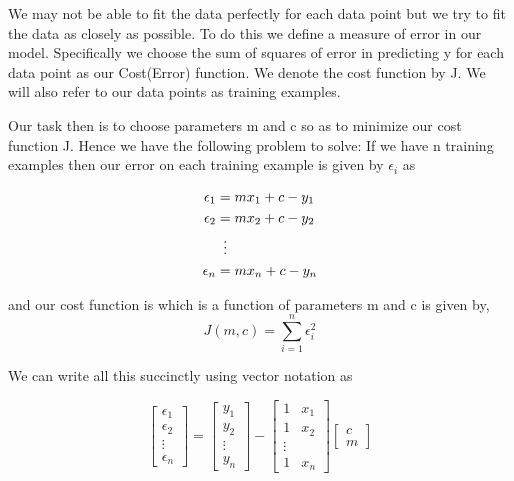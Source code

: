 \documentclass[14pt]{article}
\begin{document}
    We may not be able to fit the data perfectly for each data point but we try to fit the data as closely as possible.
    To do this we define a measure of error in our model.
    Specifically we choose the sum of squares of error in predicting y for each data point as our Cost(Error) function. We denote the cost function by J. We will also refer to our data points as training examples.

    Our task then is to choose parameters m and c so as to minimize our cost function J. Hence we have the following problem to solve: If we have n training examples then our error on each training example is given by $ \epsilon_{i} $ as

    \begin{align}
        \epsilon_{1} &= mx_{1} + c - y_{1} \\
        \epsilon_{2} &= mx_{2} + c - y_{2} \\
        &\vdotswithin{=} \nonumber \\
        \epsilon_{n} &= mx_{n} + c - y_{n} \\
    \end{align}

    \noindent and our cost function is which is a function of parameters m and c is given by,
    \[ J(m,c) = \sum_{i=1}^{n} \epsilon_{i}^2 \]

    \noindent We can write all this succinctly using vector notation as

    \[
    \begin{bmatrix}
        \epsilon_{1}\\
        \epsilon_{2}\\
        \vdots\\
        \epsilon_{n}
    \end{bmatrix}
    =
    \begin{bmatrix}
        y_{1}\\
        y_{2}\\
        \vdots\\
        y_{n}
    \end{bmatrix}
    -
    \begin{bmatrix}
        1 & x_{1}\\
        1 & x_{2}\\
        \vdots\\
        1 & x_{n}
    \end{bmatrix}
    \begin{bmatrix}
        c\\
        m
    \end{bmatrix}
    \]
\end{document}
